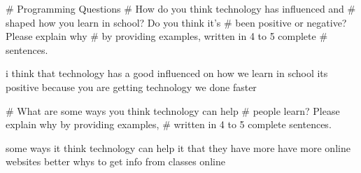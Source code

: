 # Programming Questions
# How do you think technology has influenced and
# shaped how you learn in school? Do you think it's
# been positive or negative? Please explain why 
# by providing examples, written in 4 to 5 complete 
# sentences. 

i think that technology has a good influenced on how we learn
 in school its positive because you are getting technology
  we  done faster

# What are some ways you think technology can help 
# people learn? Please explain why by providing examples,
# written in 4 to 5 complete sentences. 

some ways it think  technology  can help it that they
 have  more have more  online websites
better whys to get info from classes online